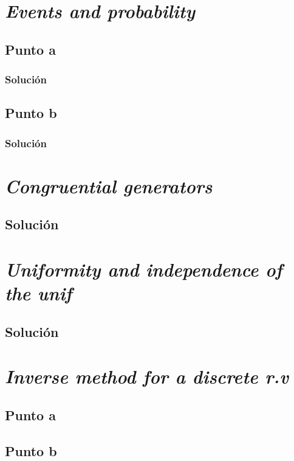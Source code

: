 \documentclass[12pt]{article}
\begin{document}
\tableofcontents


\section{\textit{Events and probability}}
\subsection{Punto a}
\subsubsection{Solución}

\subsection{Punto b}
\subsubsection{Solución}

\section{\textit{Congruential generators}}
\subsection{Solución}

\section{\textit{Uniformity and independence of the unif}}
\subsection{Solución}

\section{\textit{Inverse method for a discrete r.v}}

\subsection{Punto a}

\subsection{Punto b}
\end{document}
